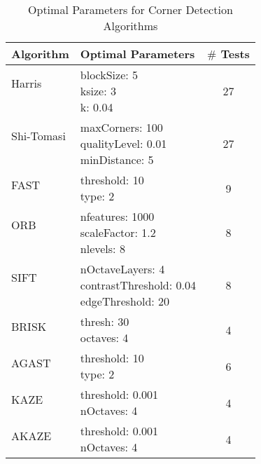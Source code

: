 \documentclass[journal]{IEEEtran}
\begin{document}
\begin{table}[h]
    \centering
    \small
    \caption{Optimal Parameters for Corner Detection Algorithms}
    \label{tab:optimal_parameters}
    \begin{tabular}{lp{3.5cm}c}
    \toprule
    \textbf{Algorithm} & \textbf{Optimal Parameters} & \textbf{$\#$ Tests} \\
    \midrule
    Harris & \multirow{3}{*}{\parbox{3.5cm}{\raggedright blockSize: 5\\ksize: 3\\k: 0.04}} & \multirow{3}{*}{27} \\
    & & \\
    & & \\
    Shi-Tomasi & \multirow{3}{*}{\parbox{3.5cm}{\raggedright maxCorners: 100\\qualityLevel: 0.01\\minDistance: 5}} & \multirow{3}{*}{27} \\
    & & \\
    & & \\
    FAST & \multirow{2}{*}{\parbox{3.5cm}{\raggedright threshold: 10\\type: 2}} & \multirow{2}{*}{9} \\
    & & \\
    ORB & \multirow{3}{*}{\parbox{3.5cm}{\raggedright nfeatures: 1000\\scaleFactor: 1.2\\nlevels: 8}} & \multirow{3}{*}{8} \\
    & & \\
    & & \\
    SIFT & \multirow{3}{*}{\parbox{3.5cm}{\raggedright nOctaveLayers: 4\\contrastThreshold: 0.04\\edgeThreshold: 20}} & \multirow{3}{*}{8} \\
    & & \\
    & & \\
    BRISK & \multirow{2}{*}{\parbox{3.5cm}{\raggedright thresh: 30\\octaves: 4}} & \multirow{2}{*}{4} \\
    & & \\
    AGAST & \multirow{2}{*}{\parbox{3.5cm}{\raggedright threshold: 10\\type: 2}} & \multirow{2}{*}{6} \\
    & & \\
    KAZE & \multirow{2}{*}{\parbox{3.5cm}{\raggedright threshold: 0.001\\nOctaves: 4}} & \multirow{2}{*}{4} \\
    & & \\
    AKAZE & \multirow{2}{*}{\parbox{3.5cm}{\raggedright threshold: 0.001\\nOctaves: 4}} & \multirow{2}{*}{4} \\
    & & \\
    \bottomrule
    \end{tabular}
\end{table}
\end{document}
